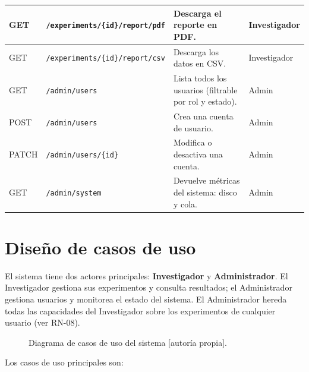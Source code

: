 \begin{longtable}{|p{1.5cm}|p{4.0cm}|p{4.0cm}|p{3.5cm}|}
GET  & \texttt{/experiments/\{id\}/report/pdf} & Descarga el reporte en PDF. & Investigador \\
\hline
GET  & \texttt{/experiments/\{id\}/report/csv} & Descarga los datos en CSV. & Investigador \\
\hline

GET  & \texttt{/admin/users} & Lista todos los usuarios (filtrable por rol y estado). & Admin \\
\hline
POST & \texttt{/admin/users} & Crea una cuenta de usuario. & Admin \\
\hline
PATCH & \texttt{/admin/users/\{id\}} & Modifica o desactiva una cuenta. & Admin \\
\hline
GET  & \texttt{/admin/system} & Devuelve métricas del sistema: disco y cola. & Admin \\
\hline

\end{longtable}

\section{Diseño de casos de uso}

El sistema tiene dos actores principales: \textbf{Investigador} y
\textbf{Administrador}. El Investigador gestiona sus experimentos y consulta
resultados; el Administrador gestiona usuarios y monitorea el estado del sistema.
El Administrador hereda todas las capacidades del Investigador sobre los experimentos
de cualquier usuario (ver RN-08).

\begin{figure}[ht]
\centering
\caption{Diagrama de casos de uso del sistema [autoría propia].}
\label{fig:casos_uso}
\end{figure}

Los casos de uso principales son:

